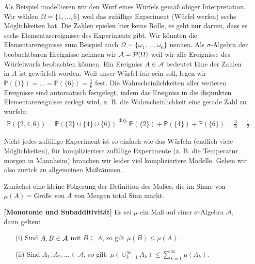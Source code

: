 \begin{disc}
\begin{itemize}
	\end{itemize}
	Als Beispiel modellieren wir den Wurf eines W\"urfels gem\"a\ss{} obiger Interpretation. Wir w\"ahlen $\Omega = \{1,...,6\}$ weil das zuf\"allige Experiment (W\"urfel werfen) sechs M\"oglichkeiten hat. Die Zahlen spielen hier keine Rolle, es geht nur darum, dass es sechs Elementarereignisse des Experiments gibt. Wir k\"onnten die Elementarereignisse zum Beispiel auch $\Omega=\{\omega_1,...,\omega_6\}$ nennen. Als $\sigma$-Algebra der beobachtbaren Ereignisse nehmen wir $\mathcal{A}=\mathcal P(\Omega)$ weil wir alle Ereignisse des W\"urfelwurfs beobachten k\"onnen. Ein Ereigniss $A\in \mathcal A$ bedeutet \glqq Eine der Zahlen in $A$ ist gew\"urfelt worden\grqq.  Weil unser W\"urfel fair sein soll, legen wir $\mathbb P(\{1\})=...=\mathbb P(\{6\})= \frac{1}{6}$ fest. Die Wahrscheinlichkeiten aller weiteren Ereignisse sind automatisch festgelegt, indem das Ereigniss in die disjunkten Elementarereignisse zerlegt wird, z. B. die Wahrscheinlichkeit eine gerade Zahl zu w\"urfeln:
	\begin{align*}	
		\mathbb P(\{2, 4,6\}) =\mathbb P(\{2\}\cupdot \{4\} \cupdot \{6\})\overset{\text{disj.}}{=} \mathbb P(\{2\})+\mathbb P(\{4\})+\mathbb P(\{6\}) =\frac{3}{6}= \frac{1}{2}.
	\end{align*}
	\end{disc}
Nicht jedes zuf\"allige Experiment ist so einfach wie das W\"urfeln (endlich viele M\"oglichkeiten), f\"ur kompliziertere zuf\"allige Experimente (z. B. die Temperatur morgen in Mannheim) brauchen wir leider viel kompliziertere Modelle. Gehen wir also zur\"uck zu allgemeinen Ma\ss r\"aumen.\smallskip

Zun\"achst eine kleine Folgerung der Definition des Ma\ss es, die im Sinne von \glqq $\mu(A)=$Gr\"o\ss e von $A$\grqq{} von Mengen total Sinn macht.
\begin{laussagewerkzeug}
\begin{lemma} \label{monsub}  \textbf{[Monotonie und Subadditivit\"at]}
Es sei $\mu$ ein Ma\ss{} auf einer  $\sigma$-Algebra $\mathcal A$, dann gelten:
\begin{itemize}
\item[(i)] Sind $A, B \in \mathcal{A}$ mit $B \subseteq A$, so gilt $\mu(B) \leq \mu(A).$
\item[(ii)] Sind $A_1,A_2,... \in \mathcal A$, so gilt: $\mu(\cup_{k=1}^\infty A_k)\leq \sum_{k=1}^\infty \mu(A_k)$.
\end{itemize}
\end{lemma}
\end{laussagewerkzeug}

